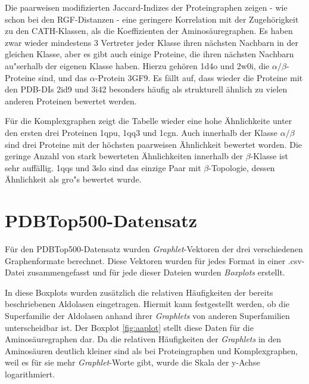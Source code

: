 \documentclass{report}
\begin{document}
Die paarweisen modifizierten Jaccard-Indizes der Proteingraphen zeigen - wie schon bei den RGF-Distanzen - eine geringere Korrelation mit der Zugeh\"origkeit zu den CATH-Klassen, als die Koeffizienten der Aminos\"auregraphen. Es haben zwar wieder mindestens 3 Vertreter jeder Klasse ihren n\"achsten Nachbarn in der gleichen Klasse, aber es gibt auch einige Proteine, die ihren n\"achsten Nachbarn au"serhalb der eigenen Klasse haben. Hierzu geh\"oren 1d4o und 2w0i, die $\alpha/\beta$-Proteine sind, und das $\alpha$-Protein 3GF9. Es f\"allt auf, dass wieder die Proteine mit den PDB-DIs 2id9 und 3i42 besonders h\"aufig als strukturell \"ahnlich zu vielen anderen Proteinen bewertet werden.

F\"ur die Komplexgraphen zeigt die Tabelle wieder eine hohe \"Ahnlichkeite unter den ersten drei Proteinen 1qpu, 1qq3 und 1cgn. Auch innerhalb der Klasse $\alpha/\beta$ sind drei Proteine mit der h\"ochsten paarweisen \"Ahnlichkeit bewertet worden. Die geringe Anzahl von stark bewerteten \"Ahnlichkeiten innerhalb der $\beta$-Klasse ist sehr auff\"allig. 1qqs und 3slo sind das einzige Paar mit $\beta$-Topologie, dessen \"Ahnlichkeit als gro"s bewertet wurde.


\section{PDBTop500-Datensatz}

F\"ur den PDBTop500-Datensatz wurden \textit{Graphlet}-Vektoren der drei verschiedenen Graphenformate berechnet. Diese Vektoren wurden f\"ur jedes Format in einer .csv-Datei zusammengefasst und f\"ur jede dieser Dateien wurden \textit{Boxplots} erstellt.

In diese Boxplots wurden zus\"atzlich die relativen H\"aufigkeiten der bereits beschriebenen Aldolasen eingetragen. Hiermit kann festgestellt werden, ob die Superfamilie der Aldolasen anhand ihrer \textit{Graphlets} von anderen Superfamilien unterscheidbar ist.
Der Boxplot \ref{fig:aaplot} stellt diese Daten f\"ur die Aminos\"auregraphen dar. Da die relativen H\"aufigkeiten der \textit{Graphlets} in den Aminos\"auren deutlich kleiner sind als bei Proteingraphen und Komplexgraphen, weil es f\"ur sie mehr \textit{Graphlet}-Worte gibt, wurde die Skala der y-Achse logarithmiert.
\end{document}
